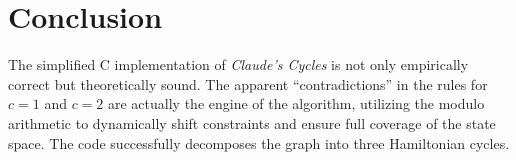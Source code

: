 \documentclass[10pt, letterpaper]{article}
\begin{document}
\section{Conclusion}

The simplified C implementation of \textit{Claude's Cycles} is not only empirically correct but theoretically sound. The apparent ``contradictions'' in the rules for $c=1$ and $c=2$ are actually the engine of the algorithm, utilizing the modulo arithmetic to dynamically shift constraints and ensure full coverage of the state space. The code successfully decomposes the graph into three Hamiltonian cycles.
\end{document}
